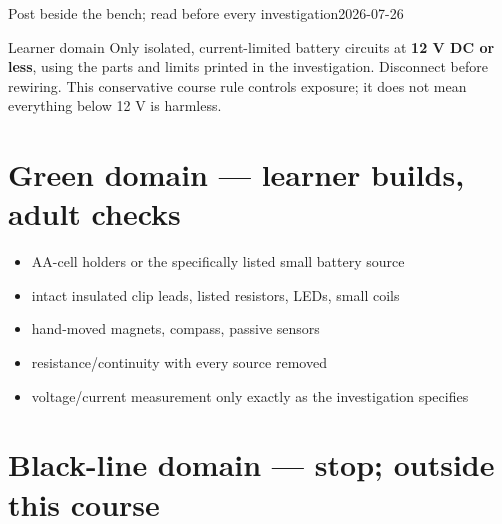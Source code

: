 

  {Post beside the bench; read before every investigation}{2026-07-26}


\begin{teloshazard}{Learner domain}
Only isolated, current-limited battery circuits at \textbf{12 V DC or less},
using the parts and limits printed in the investigation. Disconnect before
rewiring. This conservative course rule controls exposure; it does not mean
everything below 12 V is harmless.
\end{teloshazard}

\section{Green domain — learner builds, adult checks}
\begin{itemize}
\item AA-cell holders or the specifically listed small battery source
\item intact insulated clip leads, listed resistors, LEDs, small coils
\item hand-moved magnets, compass, passive sensors
\item resistance/continuity with every source removed
\item voltage/current measurement only exactly as the investigation specifies
\end{itemize}

\section{Black-line domain — stop; outside this course}
\begin{telosfacts}[0.22]
\end{telosfacts}

